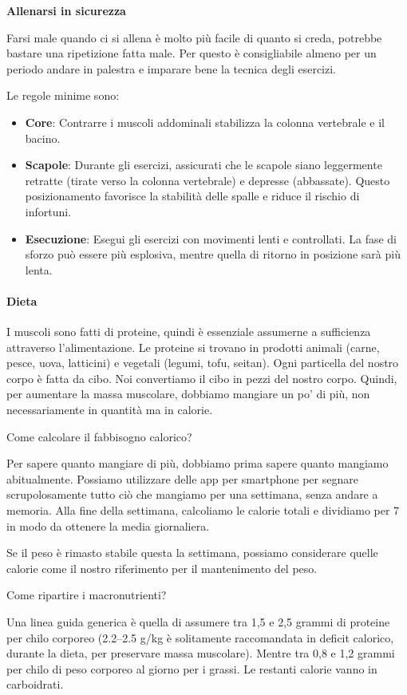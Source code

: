 \documentclass[12pt]{book} %
\begin{document}
\textbf{Allenarsi in sicurezza}

Farsi male quando ci si allena è molto più facile di quanto si creda, potrebbe bastare una ripetizione fatta male. Per questo è consigliabile almeno per un periodo andare in palestra e imparare bene la tecnica degli esercizi.

Le regole minime sono:
\begin{itemize}
\item \textbf{Core}: Contrarre i muscoli addominali stabilizza la colonna vertebrale e il bacino.
\item \textbf{Scapole}: Durante gli esercizi, assicurati che le scapole siano leggermente retratte (tirate verso la colonna vertebrale) e depresse (abbassate). Questo posizionamento favorisce la stabilità delle spalle e riduce il rischio di infortuni.
\item \textbf{Esecuzione}: Esegui gli esercizi con movimenti lenti e controllati. La fase di sforzo può essere più esplosiva, mentre quella di ritorno in posizione sarà più lenta.
\end{itemize}

\paragraph{Dieta}
I muscoli sono fatti di proteine, quindi è essenziale assumerne a sufficienza attraverso l'alimentazione. Le proteine si trovano in prodotti animali (carne, pesce, uova, latticini) e vegetali (legumi, tofu, seitan).
Ogni particella del nostro corpo è fatta da cibo. Noi convertiamo il cibo in pezzi del nostro corpo. Quindi, per aumentare la massa muscolare, dobbiamo mangiare un po' di più, non necessariamente in quantità ma in calorie.

Come calcolare il fabbisogno calorico?

Per sapere quanto mangiare di più, dobbiamo prima sapere quanto mangiamo abitualmente. Possiamo utilizzare delle app per smartphone per segnare scrupolosamente tutto ciò che mangiamo per una settimana, senza andare a memoria. Alla fine della settimana, calcoliamo le calorie totali e dividiamo per 7 in modo da ottenere la media giornaliera.

Se il peso è rimasto stabile questa la settimana, possiamo considerare quelle calorie come il nostro riferimento per il mantenimento del peso.

Come ripartire i macronutrienti?

Una linea guida generica è quella di assumere tra 1,5 e 2,5 grammi di proteine per chilo corporeo (2.2–2.5 g/kg è solitamente raccomandata in deficit calorico, durante la dieta, per preservare massa muscolare). Mentre tra 0,8 e 1,2 grammi per chilo di peso corporeo al giorno per i grassi. Le restanti calorie vanno in carboidrati.
\end{document}
